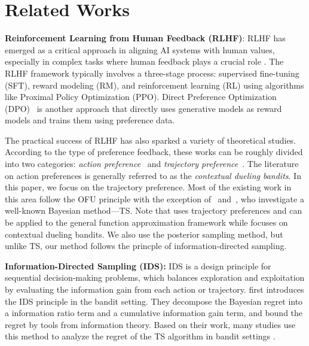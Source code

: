 \section{Related Works}
\textbf{Reinforcement Learning from Human Feedback (RLHF)}: RLHF has emerged as a critical approach in aligning AI systems with human values, especially in complex tasks where human feedback plays a crucial role \citep{achiam2023gpt,touvron2023llama}. The RLHF framework typically involves a three-stage process: supervised fine-tuning (SFT), reward modeling (RM), and reinforcement learning (RL) using algorithms like Proximal Policy Optimization (PPO)\citep{ouyang2022training,ziegler2019fine}.
Direct Preference Optimization (DPO)~\citep{rafailov2024direct}  is another approach that directly uses generative models as reward models and trains them using preference data. 

The practical success of RLHF has also sparked a variety of theoretical studies. According to the type of preference feedback, these works can be roughly divided into two categories: \emph{action preference}~\citep{furnkranz2012preference,saha2021optimal,ji2024reinforcement,sekhari2024contextual,li2024feel,bai2025online} and \emph{trajectory preference}~\citep{busa2014preference,xu2020preference,pacchiano2021dueling,chen2022human,taranovic2022adversarial,wu2023making}. The literature  on action preferences is generally referred to as the \emph{contextual dueling bandits}.
In this paper, we focus on the trajectory preference. Most of the existing work in this area follow the OFU principle 
with the exception of~\citep{wu2023making,li2024feel} and~\citep{li2024feel}, who investigate a well-known Bayesian method—TS. Note that \citet{wu2023making} uses trajectory preferences and can be applied to the general function approximation framework while \citet{li2024feel} focuses on contextual dueling bandits. We also use the posterior sampling method, but unlike TS, our method follows the princple of  information-directed sampling.

\textbf{Information-Directed Sampling (IDS):} IDS is a design principle for sequential decision-making problems, which balances
exploration and exploitation by evaluating the information gain from each action or trajectory. \citet{russo2014learning} first introduces the IDS principle in the bandit setting. They decompose the Bayesian regret into a information ratio term and a cumulative information gain term, and bound the regret by tools from information theory. Based on their work, many studies use this method to analyze the regret of the TS algorithm in bandit settings \citep{russo2016information,dong2018information,bubeck2020first,liu2018information,kirschner2021asymptotically,hao2021information,hao2022contextual}. 

